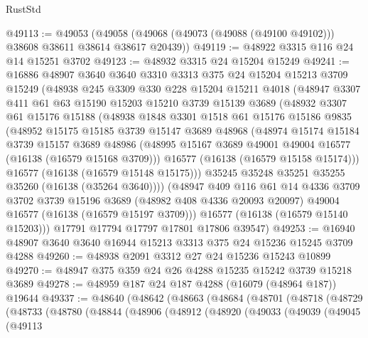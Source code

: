 \begin{lexlean}{RustStd}
\begin{coremodule}
@49113 := @49053
    (@49058 (@49068 (@49073 (@49088 (@49100 @49102))) @38608 @38611 @38614 @38617 @20439))
@49119 := @48922 @3315 @116 @24 @14 @15251 @3702
@49123 := @48932 @3315 @24 @15204 @15249
@49241 := @16886
    @48907
    @3640
    @3640
    @3310
    @3313
    @375
    @24
    @15204
    @15213
    @3709
    @15249
    (@48938
      @245
      @3309
      @330
      @228
      @15204
      @15211
      @4018
      (@48947
        @3307
        @411
        @61
        @63
        @15190
        @15203
        @15210
        @3739
        @15139
        @3689
        (@48932
          @3307
          @61
          @15176
          @15188
          (@48938
            @1848
            @3301
            @1518
            @61
            @15176
            @15186
            @9835
            (@48952
              @15175
              @15185
              @3739
              @15147
              @3689
              @48968
              (@48974
                @15174
                @15184
                @3739
                @15157
                @3689
                @48986
                (@48995 @15167 @3689 @49001 @49004 @16577 (@16138 (@16579 @15168 @3709)))
                @16577
                (@16138 (@16579 @15158 @15174)))
              @16577
              (@16138 (@16579 @15148 @15175)))
            @35245
            @35248
            @35251
            @35255
            @35260
            (@16138 (@35264 @3640))))
        (@48947
          @409
          @116
          @61
          @14
          @4336
          @3709
          @3702
          @3739
          @15196
          @3689
          (@48982 @408 @4336 @20093 @20097)
          @49004
          @16577
          (@16138 (@16579 @15197 @3709)))
        @16577
        (@16138 (@16579 @15140 @15203)))
      @17791
      @17794
      @17797
      @17801
      @17806
      @39547)
@49253 := @16940 @48907 @3640 @3640 @16944 @15213 @3313 @375 @24 @15236 @15245 @3709 @4288
@49260 := @48938 @2091 @3312 @27 @24 @15236 @15243 @10899
@49270 := @48947 @375 @359 @24 @26 @4288 @15235 @15242 @3739 @15218 @3689
@49278 := @48959 @187 @24 @187 @4288 (@16079 (@48964 @187)) @19644
@49337 := @48640
    (@48642
      (@48663
        (@48684
          (@48701
            (@48718
              (@48729
                (@48733
                  (@48780
                    (@48844
                      (@48906
                        (@48912
                          (@48920
                            (@49033
                              (@49039
                                (@49045
                                  (@49113

\end{coremodule}
\end{lexlean}

